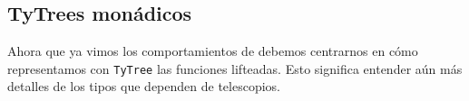 \subsection{TyTrees monádicos}

Ahora que ya vimos los comportamientos de \lift debemos centrarnos en cómo representamos con \lstinline{TyTree} las funciones lifteadas.
Esto significa entender aún más detalles de los tipos que dependen de telescopios.